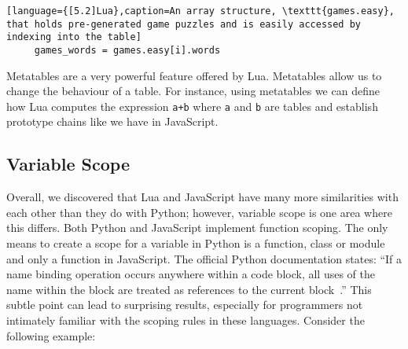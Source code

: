 \begin{lstlisting}[language={[5.2]Lua},caption=An array structure, \texttt{games.easy}, that holds pre-generated game puzzles and is easily accessed by indexing into the table]
     games_words = games.easy[i].words
\end{lstlisting}

Metatables are a very powerful feature offered by Lua. Metatables allow us to change the behaviour of a table. For instance, using metatables we can define how Lua computes the expression \texttt{a+b} where \texttt{a} and \texttt{b} are tables and establish prototype chains like we have in JavaScript. 

%
%
%


\subsection{Variable Scope}
\label{varscope}

Overall, we discovered that Lua and JavaScript have many more similarities with
each other than they do with Python; however, variable scope is one area
where this differs. Both Python and JavaScript implement function scoping. The only
means to create a scope for a variable in Python is a function, class or module and
only a function in JavaScript. The official Python documentation states: 
``If a name binding operation occurs anywhere within a code block, all uses of the 
name within the block are treated as references to the current block~\cite{pyscope}.'' 
This subtle point can lead to surprising results, especially for programmers not
intimately familiar with the scoping rules in these languages. Consider the
following example:

